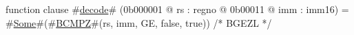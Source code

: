 function clause #\hyperref[zdecode]{decode}# (0b000001 @ rs : regno @ 0b00011 @ imm : imm16) =
  #\hyperref[zSome]{Some}#(#\hyperref[zBCMPZ]{BCMPZ}#(rs, imm, GE, false, true))  /* BGEZL */
